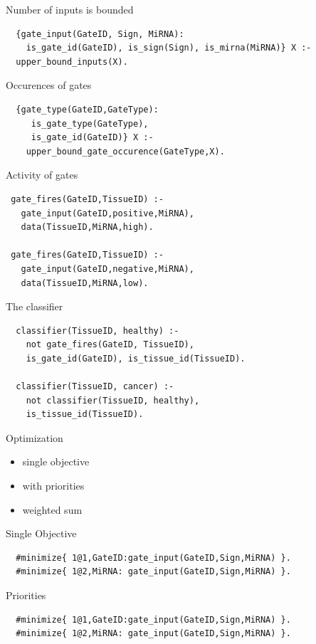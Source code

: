 \documentclass[10pt,dvipsnames]{beamer}
\begin{document}
\begin{frame}[fragile]{Number of inputs is bounded}
 \begin{verbatim}
  {gate_input(GateID, Sign, MiRNA):
    is_gate_id(GateID), is_sign(Sign), is_mirna(MiRNA)} X :-
  upper_bound_inputs(X).
 \end{verbatim}
\end{frame}

\begin{frame}[fragile]{Occurences of gates}
 \begin{verbatim}
  {gate_type(GateID,GateType):
     is_gate_type(GateType),
     is_gate_id(GateID)} X :-
    upper_bound_gate_occurence(GateType,X).
 \end{verbatim}
\end{frame}
 

\begin{frame}[fragile]{Activity of gates}
 \begin{verbatim}
 gate_fires(GateID,TissueID) :-
   gate_input(GateID,positive,MiRNA),
   data(TissueID,MiRNA,high).
   
 gate_fires(GateID,TissueID) :-
   gate_input(GateID,negative,MiRNA),
   data(TissueID,MiRNA,low).
 \end{verbatim}
\end{frame}

\begin{frame}[fragile]{The classifier}
 \begin{verbatim}
  classifier(TissueID, healthy) :-
    not gate_fires(GateID, TissueID),
    is_gate_id(GateID), is_tissue_id(TissueID).
    
  classifier(TissueID, cancer) :-
    not classifier(TissueID, healthy),
    is_tissue_id(TissueID).
 \end{verbatim}
\end{frame}



\begin{frame}{Optimization}
 \begin{itemize}
  \item single objective
  \item with priorities
  \item weighted sum
 \end{itemize}
\end{frame}

\begin{frame}[fragile]{Single Objective}
 \begin{verbatim}
  #minimize{ 1@1,GateID:gate_input(GateID,Sign,MiRNA) }.
  #minimize{ 1@2,MiRNA: gate_input(GateID,Sign,MiRNA) }.
 \end{verbatim}
\end{frame}

\begin{frame}[fragile]{Priorities}
 \begin{verbatim}
  #minimize{ 1@1,GateID:gate_input(GateID,Sign,MiRNA) }.
  #minimize{ 1@2,MiRNA: gate_input(GateID,Sign,MiRNA) }.
 \end{verbatim}
\end{frame}
\end{document}
